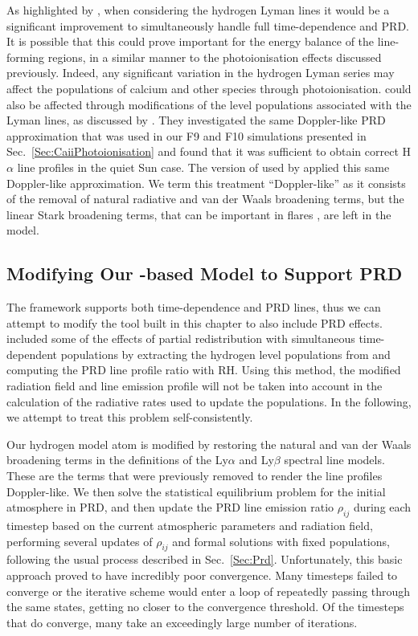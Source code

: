 As highlighted by \citet{Brown2018}, when considering the hydrogen Lyman lines it would be a significant improvement to simultaneously handle full time-dependence and PRD.
It is possible that this could prove important for the energy balance of the line-forming regions, in a similar manner to the photoionisation effects discussed previously.
Indeed, any significant variation in the hydrogen Lyman series may affect the populations of calcium and other species through photoionisation.
\Ha{} could also be affected through modifications of the level populations associated with the Lyman lines, as discussed by \citet{Leenaarts2012a}.
They investigated the same Doppler-like PRD approximation that was used in our F9 and F10 \Radyn{} simulations presented in Sec.~\ref{Sec:CaiiPhotoionisation} and found that it was sufficient to obtain correct H$\alpha$ line profiles in the quiet Sun case.
The version of \Radyn{} used by \citet{Brown2018} applied this same Doppler-like approximation.
We term this treatment ``Doppler-like'' as it consists of the removal of natural radiative and van der Waals broadening terms, but the linear Stark broadening terms, that can be important in flares \citep[e.g.][]{DeFeiter1975}, are left in the model.

\subsection{Modifying Our \Lw{}-based Model to Support PRD}

The \Lw{} framework supports both time-dependence and PRD lines, thus we can attempt to modify the tool built in this chapter to also include PRD effects.
\citet{Hong2019} included some of the effects of partial redistribution with simultaneous time-dependent populations by extracting the hydrogen level populations from \Radyn{} and computing the PRD line profile ratio with RH.
Using this method, the modified radiation field and line emission profile will not be taken into account in the calculation of the radiative rates used to update the populations.
In the following, we attempt to treat this problem self-consistently.

Our hydrogen model atom is modified by restoring the natural and van der Waals broadening terms in the definitions of the Ly$\alpha$ and Ly$\beta$ spectral line models.
These are the terms that were previously removed to render the line profiles Doppler-like.
We then solve the statistical equilibrium problem for the initial atmosphere in PRD, and then update the PRD line emission ratio $\rho_{ij}$ during each timestep based on the current atmospheric parameters and radiation field, performing several updates of $\rho_{ij}$ and formal solutions with fixed populations, following the usual process described in Sec.~\ref{Sec:Prd}.
Unfortunately, this basic approach proved to have incredibly poor convergence.
Many timesteps failed to converge or the iterative scheme would enter a loop of repeatedly passing through the same states, getting no closer to the convergence threshold.
Of the timesteps that do converge, many take an exceedingly large number of iterations.

